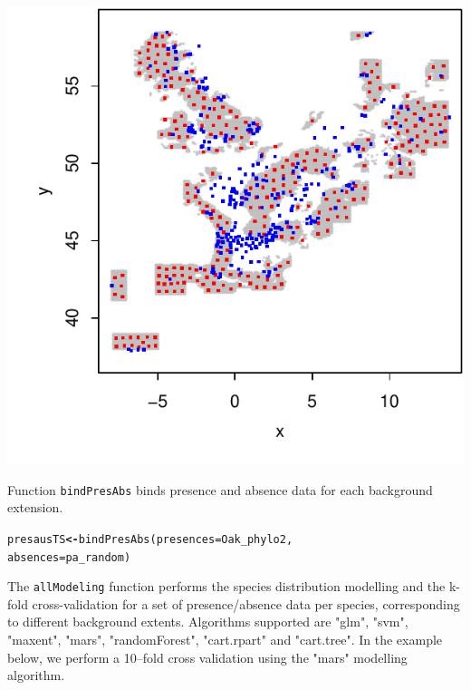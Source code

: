 \documentclass[10pt,a4paper]{article}\usepackage[]{graphicx}\usepackage[]{color}
\makeatletter
\def\maxwidth{ %
  \ifdim\Gin@nat@width>\linewidth
    \linewidth
  \else
    \Gin@nat@width
  \fi
}
\newcommand{\hlstd}[1]{\textcolor[rgb]{0,0,0}{#1}}%
\newcommand{\hlkwb}[1]{\textcolor[rgb]{0,0,0.4}{\textbf{#1}}}%
\newcommand{\hlkwc}[1]{\textcolor[rgb]{0,0,0.4}{#1}}%
\newcommand{\hlkwd}[1]{\textcolor[rgb]{0,0.267,0.4}{#1}}%
\newenvironment{kframe}{%
 \def\at@end@of@kframe{}%
 \ifinner\ifhmode%
  \def\at@end@of@kframe{\end{minipage}}%
  \begin{minipage}{\columnwidth}%
 \fi\fi%
 \def\FrameCommand##1{\hskip\@totalleftmargin \hskip-\fboxsep
 \colorbox{shadecolor}{##1}\hskip-\fboxsep
     \hskip-\linewidth \hskip-\@totalleftmargin \hskip\columnwidth}%
 \MakeFramed {\advance\hsize-\width
   \@totalleftmargin\z@ \linewidth\hsize
   \@setminipage}}%
 {\par\unskip\endMakeFramed%
 \at@end@of@kframe}
\newenvironment{knitrout}{}{} %
\makeatother
\begin{document}
\begin{knitrout}
{\centering \includegraphics[width=\maxwidth]{figure/graphics-mopa10-1} 

}



\end{knitrout}


Function \texttt{bindPresAbs} binds presence and absence data for each background extension.

\begin{knitrout}
\color{fgcolor}\begin{kframe}
\begin{alltt}
\hlstd{presausTS} \hlkwb{<-} \hlkwd{bindPresAbs}\hlstd{(}\hlkwc{presences} \hlstd{= Oak_phylo2,}
                       \hlkwc{absences} \hlstd{= pa_random)}
\end{alltt}
\end{kframe}
\end{knitrout}

The \texttt{allModeling} function performs the species distribution modelling and the k-fold cross-validation for a set of presence/absence data per species, corresponding to different background 
extents. Algorithms supported are "glm", "svm", "maxent", "mars", "randomForest", "cart.rpart" 
and "cart.tree". In the example below, we perform a 10--fold cross validation using the "mars" modelling algorithm.
\end{document}
